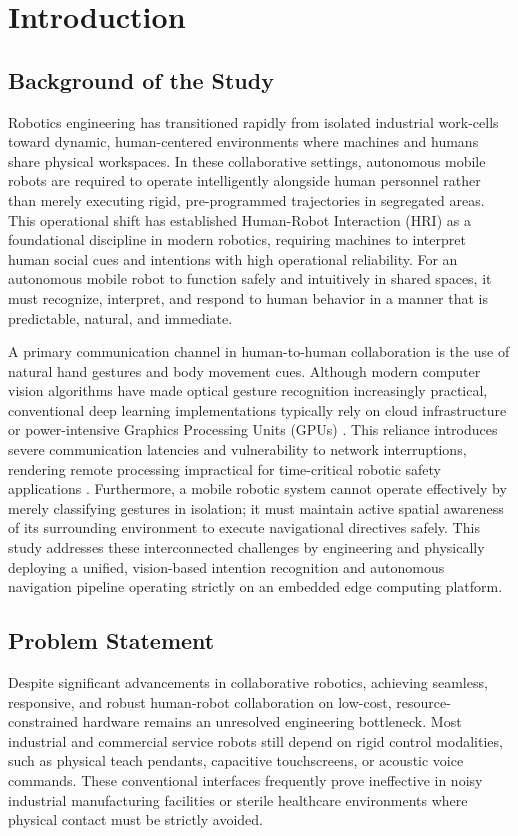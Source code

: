 \chapter{Introduction}

\section{Background of the Study}
Robotics engineering has transitioned rapidly from isolated industrial work-cells toward dynamic, human-centered environments where machines and humans share physical workspaces. In these collaborative settings, autonomous mobile robots are required to operate intelligently alongside human personnel rather than merely executing rigid, pre-programmed trajectories in segregated areas. This operational shift has established Human-Robot Interaction (HRI) as a foundational discipline in modern robotics, requiring machines to interpret human social cues and intentions with high operational reliability. For an autonomous mobile robot to function safely and intuitively in shared spaces, it must recognize, interpret, and respond to human behavior in a manner that is predictable, natural, and immediate.

A primary communication channel in human-to-human collaboration is the use of natural hand gestures and body movement cues. Although modern computer vision algorithms have made optical gesture recognition increasingly practical, conventional deep learning implementations typically rely on cloud infrastructure or power-intensive Graphics Processing Units (GPUs) \cite{mahmud2022}. This reliance introduces severe communication latencies and vulnerability to network interruptions, rendering remote processing impractical for time-critical robotic safety applications \cite{tsitos2022}. Furthermore, a mobile robotic system cannot operate effectively by merely classifying gestures in isolation; it must maintain active spatial awareness of its surrounding environment to execute navigational directives safely. This study addresses these interconnected challenges by engineering and physically deploying a unified, vision-based intention recognition and autonomous navigation pipeline operating strictly on an embedded edge computing platform.

\section{Problem Statement}
Despite significant advancements in collaborative robotics, achieving seamless, responsive, and robust human-robot collaboration on low-cost, resource-constrained hardware remains an unresolved engineering bottleneck. Most industrial and commercial service robots still depend on rigid control modalities, such as physical teach pendants, capacitive touchscreens, or acoustic voice commands. These conventional interfaces frequently prove ineffective in noisy industrial manufacturing facilities or sterile healthcare environments where physical contact must be strictly avoided.

